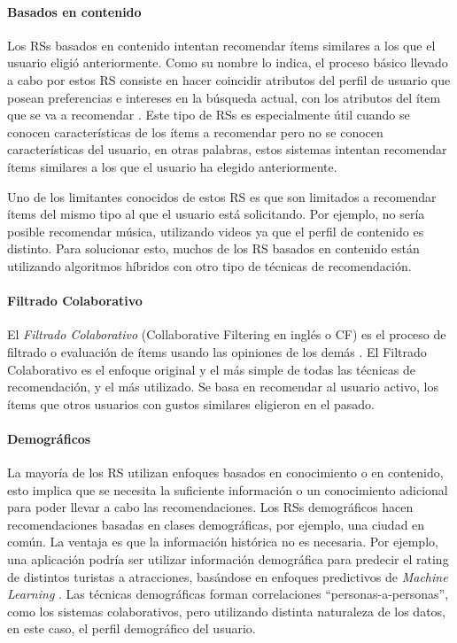 \paragraph{Basados en contenido}
Los RSs basados en contenido intentan recomendar ítems similares a los que el usuario eligió anteriormente. Como su nombre lo indica, el proceso básico llevado a cabo por estos RS consiste en hacer coincidir atributos del perfil de usuario que posean preferencias e intereses en la búsqueda actual, con los atributos del ítem que se va a recomendar \citep{lops2011content}. Este tipo de RSs es especialmente útil cuando se conocen características de los ítems a recomendar pero no se conocen características del usuario, en otras palabras, estos sistemas intentan recomendar ítems similares a los que el usuario ha elegido anteriormente.

\bigskip Uno de los limitantes conocidos de estos RS es que son limitados a recomendar ítems del mismo tipo al que el usuario está solicitando. Por ejemplo, no sería posible recomendar música, utilizando videos ya que el perfil de contenido es distinto. Para solucionar esto, muchos de los RS basados en contenido están utilizando algoritmos híbridos con otro tipo de técnicas de recomendación.

\paragraph{Filtrado Colaborativo}
El \textit{Filtrado Colaborativo} (Collaborative Filtering en inglés o CF) es el proceso de filtrado o evaluación de ítems usando las opiniones de los demás \citep{schafer2007collaborative}. El Filtrado Colaborativo es el enfoque original y el más simple de todas las técnicas de recomendación, y el más utilizado. Se basa en recomendar al usuario activo, los ítems que otros usuarios con gustos similares eligieron en el pasado.

\paragraph{Demográficos}
La mayoría de los RS utilizan enfoques basados en conocimiento o en contenido, esto implica que se necesita la suficiente información o un conocimiento adicional para poder llevar a cabo las recomendaciones. Los RSs demográficos hacen recomendaciones basadas en clases demográficas, por ejemplo, una ciudad en común. La ventaja es que la información histórica no es necesaria. Por ejemplo, una aplicación podría ser utilizar información demográfica para predecir el rating de distintos turistas a atracciones, basándose en enfoques predictivos de \textit{Machine Learning} \citep{wang2012applicability}. Las técnicas demográficas forman correlaciones “personas-a-personas”, como los sistemas colaborativos, pero utilizando distinta naturaleza de los datos, en este caso, el perfil demográfico del usuario.

